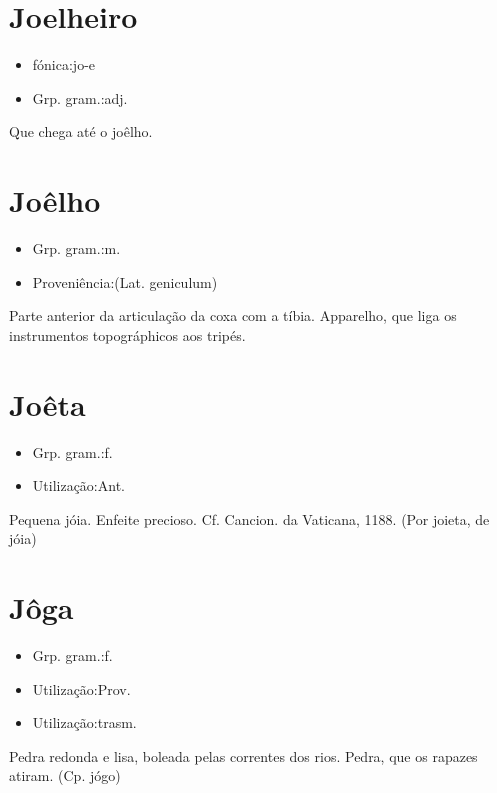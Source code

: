 \documentclass{article}
\begin{document}
\section{Joelheiro}
\begin{itemize}
\item {fónica:jo-e}
\end{itemize}
\begin{itemize}
\item {Grp. gram.:adj.}
\end{itemize}
Que chega até o joêlho.
\section{Joêlho}
\begin{itemize}
\item {Grp. gram.:m.}
\end{itemize}
\begin{itemize}
\item {Proveniência:(Lat. \textunderscore geniculum\textunderscore )}
\end{itemize}
Parte anterior da articulação da coxa com a tíbia.
Apparelho, que liga os instrumentos topográphicos aos tripés.
\section{Joêta}
\begin{itemize}
\item {Grp. gram.:f.}
\end{itemize}
\begin{itemize}
\item {Utilização:Ant.}
\end{itemize}
Pequena jóia.
Enfeite precioso. Cf. \textunderscore Cancion. da Vaticana\textunderscore , 1188.
(Por \textunderscore joieta\textunderscore , de \textunderscore jóia\textunderscore )
\section{Jôga}
\begin{itemize}
\item {Grp. gram.:f.}
\end{itemize}
\begin{itemize}
\item {Utilização:Prov.}
\end{itemize}
\begin{itemize}
\item {Utilização:trasm.}
\end{itemize}
Pedra redonda e lisa, boleada pelas correntes dos rios.
Pedra, que os rapazes atiram.
(Cp. \textunderscore jógo\textunderscore )
\end{document}
